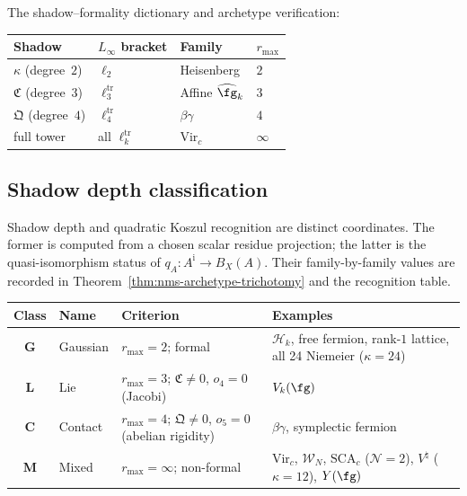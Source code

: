 \noindent
The shadow--formality dictionary and archetype verification:

\begin{center}
\renewcommand{\arraystretch}{1.15}
\begin{tabular}{@{}llll@{}}
\toprule
\textbf{Shadow} & \textbf{$L_\infty$ bracket}
 & \textbf{Family} & $r_{\max}$ \\
\midrule
$\kappa$ (degree~$2$) & $\ell_2$
 & Heisenberg & $2$ \\
$\mathfrak{C}$ (degree~$3$) & $\ell_3^{\mathrm{tr}}$
 & Affine $\widehat{\fg}_k$ & $3$ \\
$\mathfrak{Q}$ (degree~$4$) & $\ell_4^{\mathrm{tr}}$
 & $\beta\gamma$ & $4$ \\
full tower & all $\ell_k^{\mathrm{tr}}$
 & $\mathrm{Vir}_c$ & $\infty$ \\
\bottomrule
\end{tabular}
\end{center}


\subsection{Shadow depth classification}
\label{subsec:concordance-shadow-depth-classes}

Shadow depth and quadratic Koszul recognition are distinct
coordinates.  The former is computed from a chosen scalar residue
projection; the latter is the quasi-isomorphism status of
$q_A\colon A^{\mathrm i}\to B_X(A)$.  Their family-by-family values
are recorded in Theorem~\ref{thm:nms-archetype-trichotomy} and the
recognition table.

\begin{center}
\renewcommand{\arraystretch}{1.15}
\begin{tabular}{@{}clll@{}}
\toprule
\textbf{Class} & \textbf{Name} & \textbf{Criterion}
 & \textbf{Examples} \\
\midrule
\textbf{G} & Gaussian
 & $r_{\max}=2$; formal
 & $\mathcal{H}_k$, free fermion, rank-$1$ lattice, all 24 Niemeier ($\kappa{=}24$) \\
\textbf{L} & Lie
 & $r_{\max}=3$; $\mathfrak{C}\neq 0$, $o_4=0$ (Jacobi)
 & $V_k(\fg)$ \\
\textbf{C} & Contact
 & $r_{\max}=4$; $\mathfrak{Q}\neq 0$, $o_5=0$ (abelian rigidity)
 & $\beta\gamma$, symplectic fermion \\
\textbf{M} & Mixed
 & $r_{\max}=\infty$; non-formal
 & $\mathrm{Vir}_c$, $\mathcal{W}_N$, $\mathrm{SCA}_c$ ($\mathcal{N}{=}2$), $V^\natural$ ($\kappa{=}12$), $Y(\fg)$ \\
\bottomrule
\end{tabular}
\end{center}

